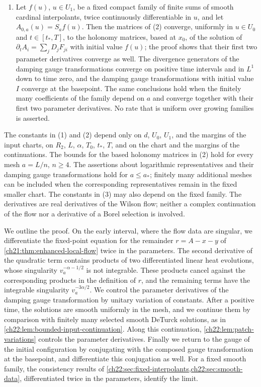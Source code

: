 \begin{theorem}
\begin{enumerate}
\item Let $f(u)$, $u\in U_1$, be a fixed compact family of finite sums of smooth cardinal interpolants, twice continuously differentiable in $u$, and let $A_{0,a}(u)=S_af(u)$. Then the matrices of (2) converge, uniformly in $u\in U_0$ and $t\in[t_*,T]$, to the holonomy matrices, based at $x_0$, of the solution of $\partial_tA_i=\sum_jD_jF_{ji}$ with initial value $f(u)$; the proof shows that their first two parameter derivatives converge as well. The divergence generators of the damping gauge transformations converge on positive time intervals and in $L^1$ down to time zero, and the damping gauge transformations with initial value $I$ converge at the basepoint. The same conclusions hold when the finitely many coefficients of the family depend on $a$ and converge together with their first two parameter derivatives. No rate that is uniform over growing families is asserted.
\end{enumerate}
The constants in (1) and (2) depend only on $d$, $U_0$, $U_1$, and the margins of the input charts, on $R_2$, $L$, $\alpha$, $T_0$, $t_*$, $T$, and on the chart and the margins of the continuations. The bounds for the based holonomy matrices in (2) hold for every mesh $a=L/n$, $n\ge4$. The assertions about logarithmic representatives and their damping gauge transformations hold for $a\le a_*$; finitely many additional meshes can be included when the corresponding representatives remain in the fixed smaller chart. The constants in (3) may also depend on the fixed family. The derivatives are real derivatives of the Wilson flow; neither a complex continuation of the flow nor a derivative of a Borel selection is involved.
\end{theorem}

We outline the proof. On the early interval, where the flow data are singular, we differentiate the fixed-point equation for the remainder $r=A-x-y$ of \cref{ch21:thm:enhanced-local-flow} twice in the parameters. The second derivative of the quadratic term contains products of two differentiated linear heat evolutions, whose singularity $v_a^{-\alpha-1/2}$ is not integrable. These products cancel against the corresponding products in the definition of $r$, and the remaining terms have the integrable singularity $v_a^{-3\alpha/2}$. We control the parameter derivatives of the damping gauge transformation by unitary variation of constants. After a positive time, the solutions are smooth uniformly in the mesh, and we continue them by comparison with finitely many selected smooth DeTurck solutions, as in \cref{ch22:lem:bounded-input-continuation}. Along this continuation, \cref{ch22:lem:patch-variations} controls the parameter derivatives. Finally we return to the gauge of the initial configuration by conjugating with the composed gauge transformation at the basepoint, and differentiate this conjugation as well. For a fixed smooth family, the consistency results of \cref{ch22:sec:fixed-interpolants,ch22:sec:smooth-data}, differentiated twice in the parameters, identify the limit.

